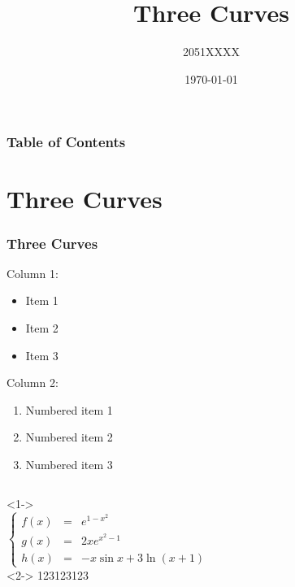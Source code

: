 \documentclass[mathserif]{beamer}
\title{Three Curves}
\author{2051XXXX}
\date{\today}
\begin{document}
\begin{frame}
\titlepage
\end{frame}
\begin{frame}
\frametitle{Table of Contents}
\tableofcontents
\end{frame}
\section{Three Curves}
\begin{frame} \label{slide3}
\frametitle{Three Curves}


\begin{multicols}{2}
Column 1:
\begin{itemize}
    \item Item 1
    \item Item 2
    \item Item 3
\end{itemize}

\columnbreak

Column 2:
\begin{enumerate}
    \item Numbered item 1
    \item Numbered item 2
    \item Numbered item 3
\end{enumerate}

\end{multicols}




\begin{columns}
<1->
\[
\left\{
\begin{array}{ccl}
f(x) & = & e^{1-x^2}\\
g(x)& = & 2xe^{x^2-1}\\
h(x)& = & -x\sin x+3\ln(x+1)
\end{array}
\right.
\]
<2->
123123123

\end{columns}

\end{frame}
\end{document}
